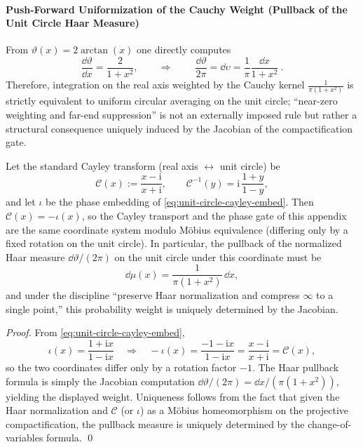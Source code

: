 \paragraph{Push-Forward Uniformization of the Cauchy Weight (Pullback of the Unit Circle Haar Measure)}
From \(\vartheta(x)=2\arctan(x)\) one directly computes
\[
\frac{\dd\vartheta}{\dd x}=\frac{2}{1+x^{2}},
\qquad\Longrightarrow\qquad
\boxed{\ \frac{\dd\vartheta}{2\pi}=\dd\upsilon=\frac{1}{\pi}\frac{\dd x}{1+x^{2}}\ }.
\]
Therefore, integration on the real axis weighted by the Cauchy kernel \(\frac{1}{\pi(1+x^{2})}\) is strictly equivalent to uniform circular averaging on the unit circle; ``near-zero weighting and far-end suppression'' is not an externally imposed rule but rather a structural consequence uniquely induced by the Jacobian of the compactification gate.

\begin{corollary}\label{cor:unit-circle-cayley-haar-forces-cauchy}
Let the standard Cayley transform (real axis \(\leftrightarrow\) unit circle) be
\[
\mathcal{C}(x):=\frac{x-\mathrm{i}}{x+\mathrm{i}},
\qquad
\mathcal{C}^{-1}(y)=\mathrm{i}\,\frac{1+y}{1-y},
\]
and let \(\iota\) be the phase embedding of \eqref{eq:unit-circle-cayley-embed}.
Then \(\mathcal{C}(x)=-\iota(x)\), so the Cayley transport and the phase gate of this appendix are the same coordinate system modulo M\"obius equivalence (differing only by a fixed rotation on the unit circle).
In particular, the pullback of the normalized Haar measure \(\dd\vartheta/(2\pi)\) on the unit circle under this coordinate must be
\[
\dd\mu(x)=\frac{1}{\pi(1+x^{2})}\,\dd x,
\]
and under the discipline ``preserve Haar normalization and compress \(\infty\) to a single point,'' this probability weight is uniquely determined by the Jacobian.
\end{corollary}
\begin{proof}
From \eqref{eq:unit-circle-cayley-embed},
\[
\iota(x)=\frac{1+\mathrm{i}x}{1-\mathrm{i}x}
\quad\Longrightarrow\quad
-\iota(x)=\frac{-1-\mathrm{i}x}{1-\mathrm{i}x}
=\frac{x-\mathrm{i}}{x+\mathrm{i}}=\mathcal{C}(x),
\]
so the two coordinates differ only by a rotation factor \(-1\).
The Haar pullback formula is simply the Jacobian computation \(\dd\vartheta/(2\pi)=\dd x/(\pi(1+x^2))\), yielding the displayed weight.
Uniqueness follows from the fact that given the Haar normalization and \(\mathcal{C}\) (or \(\iota\)) as a M\"obius homeomorphism on the projective compactification, the pullback measure is uniquely determined by the change-of-variables formula. \qed
\end{proof}

